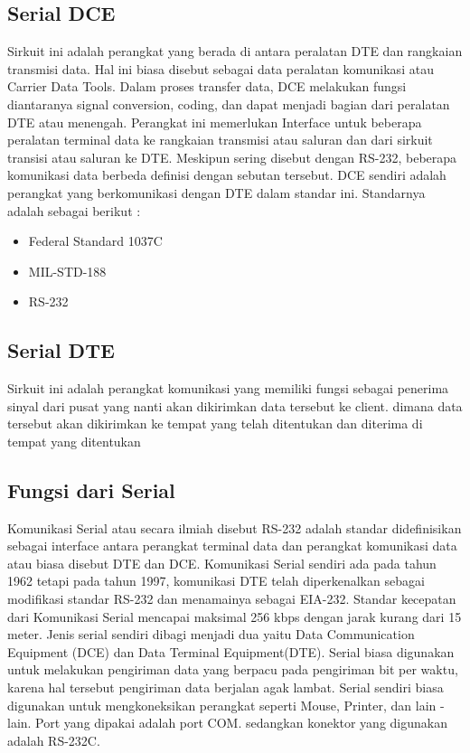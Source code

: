 \subsection{Serial DCE}
Sirkuit ini adalah perangkat yang berada di antara peralatan DTE dan rangkaian transmisi data. Hal ini biasa disebut sebagai data peralatan komunikasi atau Carrier Data Tools. Dalam proses transfer data, DCE melakukan fungsi diantaranya signal conversion, coding, dan dapat menjadi bagian dari peralatan DTE atau menengah. Perangkat ini memerlukan Interface untuk beberapa peralatan terminal data ke rangkaian transmisi atau saluran dan dari sirkuit transisi atau saluran ke DTE. Meskipun sering disebut dengan RS-232, beberapa komunikasi data berbeda definisi dengan sebutan tersebut. DCE sendiri adalah perangkat yang berkomunikasi dengan DTE dalam standar ini. Standarnya adalah sebagai berikut : 
\begin{itemize}
\item Federal Standard 1037C
\item MIL-STD-188
\item RS-232
\end{itemize}
\subsection{Serial DTE}
Sirkuit ini adalah perangkat komunikasi yang memiliki fungsi sebagai penerima sinyal dari pusat yang nanti akan dikirimkan data tersebut ke client. dimana data tersebut akan dikirimkan ke tempat yang telah ditentukan dan diterima di tempat yang ditentukan
\subsection{Fungsi dari Serial}
Komunikasi Serial atau secara ilmiah disebut RS-232 adalah standar didefinisikan sebagai interface antara perangkat terminal data dan perangkat komunikasi data atau biasa disebut DTE dan DCE. Komunikasi Serial sendiri ada pada tahun 1962 tetapi pada tahun 1997, komunikasi DTE telah diperkenalkan sebagai modifikasi standar RS-232 dan menamainya sebagai EIA-232.
Standar kecepatan dari Komunikasi Serial mencapai maksimal 256 kbps dengan jarak kurang dari 15 meter. Jenis serial sendiri dibagi menjadi dua yaitu Data Communication Equipment (DCE) dan Data Terminal Equipment(DTE).
Serial biasa digunakan untuk melakukan pengiriman data yang berpacu pada pengiriman bit per waktu, karena hal tersebut pengiriman data berjalan agak lambat. Serial sendiri biasa digunakan untuk mengkoneksikan perangkat seperti Mouse, Printer, dan lain - lain. Port yang dipakai adalah port COM. sedangkan konektor yang digunakan adalah RS-232C.
